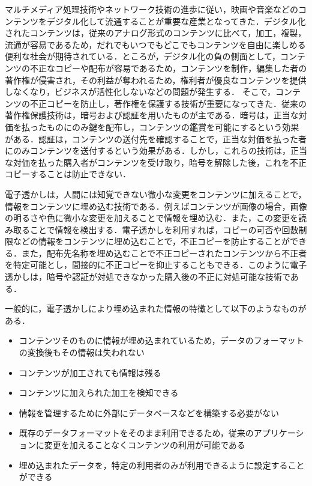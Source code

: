 \documentclass[11pt]{jreport}
\begin{document}
{\mc マルチメディア処理技術やネットワーク技術の進歩に従い，映画や音楽などのコンテンツをデジタル化して流通することが重要な産業となってきた．デジタル化されたコンテンツは，従来のアナログ形式のコンテンツに比べて，加工，複製，流通が容易であるため，だれでもいつでもどこでもコンテンツを自由に楽しめる便利な社会が期待されている．ところが，デジタル化の負の側面として，コンテンツの不正なコピーや配布が容易であるため，コンテンツを制作，編集した者の著作権が侵害され，その利益が奪われるため，権利者が優良なコンテンツを提供しなくなり，ビジネスが活性化しないなどの問題が発生する．
そこで，コンテンツの不正コピーを防止し，著作権を保護する技術が重要になってきた．従来の著作権保護技術は，暗号および認証を用いたものが主である．暗号は，正当な対価を払ったものにのみ鍵を配布し，コンテンツの鑑賞を可能にするという効果がある．認証は，コンテンツの送付先を確認することで，正当な対価を払った者にのみコンテンツを送付するという効果がある．しかし，これらの技術は，正当な対価を払った購入者がコンテンツを受け取り，暗号を解除した後，これを不正コピーすることは防止できない．\par
電子透かし\cite{maegaki1}は，人間には知覚できない微小な変更をコンテンツに加えることで，情報をコンテンツに埋め込む技術である．例えばコンテンツが画像の場合，画像の明るさや色に微小な変更を加えることで情報を埋め込む．また，この変更を読み取ることで情報を検出する．電子透かしを利用すれば，コピーの可否や回数制限などの情報をコンテンツに埋め込むことで，不正コピーを防止することができる．また，配布先名称を埋め込むことで不正コピーされたコンテンツから不正者を特定可能とし，間接的に不正コピーを抑止することもできる．このように電子透かしは，暗号や認証が対処できなかった購入後の不正に対処可能な技術である．\par
一般的に，電子透かしにより埋め込まれた情報の特徴として以下のようなものがある\cite{maegaki2}．
\begin{itemize}
\item コンテンツそのものに情報が埋め込まれているため，データのフォーマットの変換後もその情報は失われない
\item コンテンツが加工されても情報は残る
\item コンテンツに加えられた加工を検知できる
\item 情報を管理するために外部にデータベースなどを構築する必要がない
\item 既存のデータフォーマットをそのまま利用できるため，従来のアプリケーションに変更を加えることなくコンテンツの利用が可能である
\item 埋め込まれたデータを，特定の利用者のみが利用できるように設定することができる
\end{itemize}
}
\end{document}
